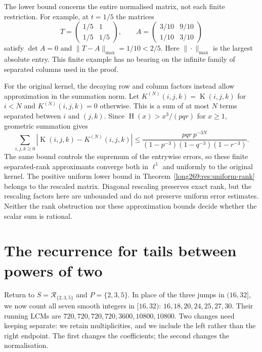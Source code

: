 \documentclass[11pt]{article}
\theoremstyle{remark}
\theoremstyle{plain}
\newcommand{\hgt}{\operatorname{H}}
\newcommand{\Kernel}{\operatorname{K}}
\begin{document}
The lower bound concerns the entire normalised matrix, not each finite
restriction.  For example, at $t=1/5$ the matrices
\[
 T=\begin{pmatrix}1/5&1\\1/5&1/5\end{pmatrix},\qquad
 A=\begin{pmatrix}3/10&9/10\\1/10&3/10\end{pmatrix}
\]
satisfy $\det A=0$ and $\|T-A\|_{\max}=1/10<2/5$.
Here $\|\cdot\|_{\max}$ is the largest absolute entry.  This finite
example has no bearing on the infinite family of separated columns used
in the proof.

For the original kernel, the decaying row and column factors instead
allow approximation in the summation norm.  Let $K^{(N)}(i,j,k)=\Kernel(i,j,k)$ for $i<N$ and
$K^{(N)}(i,j,k)=0$ otherwise.  This is a sum of at most $N$ terms separated
between $i$ and $(j,k)$.  Since
$\hgt(x)>x^3/(pqr)$ for $x\ge1$, geometric summation gives
\begin{equation}\label{long269:eq:l1-finite-rank-approximation}
 \sum_{i,j,k\ge0}|\Kernel(i,j,k)-K^{(N)}(i,j,k)|
 \le
 \frac{pqr\,p^{-3N}}
 {(1-p^{-3})(1-q^{-3})(1-r^{-3})}.
\end{equation}
The same bound controls the supremum of the entrywise errors, so these
finite separated-rank approximants converge both in $\ell^1$ and uniformly
to the original kernel.  The positive uniform lower bound in
Theorem~\ref{long269:res:uniform-rank} belongs to the rescaled matrix.
Diagonal rescaling preserves exact rank, but the rescaling factors here
are unbounded and do not preserve uniform error estimates.  Neither the
rank obstruction nor these approximation bounds decide whether the scalar
sum is rational.

\section{The recurrence for tails between powers of two}\label{long269:sec:blocks}

Return to $S=\mathcal R_{\{2,3,5\}}$ and $P=\{2,3,5\}$. In place of
the three jumps in $(16,32]$, we now count all seven smooth integers in
$[16,32)$: $16,18,20,24,25,27,30$. Their running LCMs are
$720,720,720,720,3600,10800,10800$. Two changes need keeping separate:
we retain multiplicities, and we include the left rather than the right
endpoint. The first changes the coefficients; the second changes the
normalisation.
\end{document}
